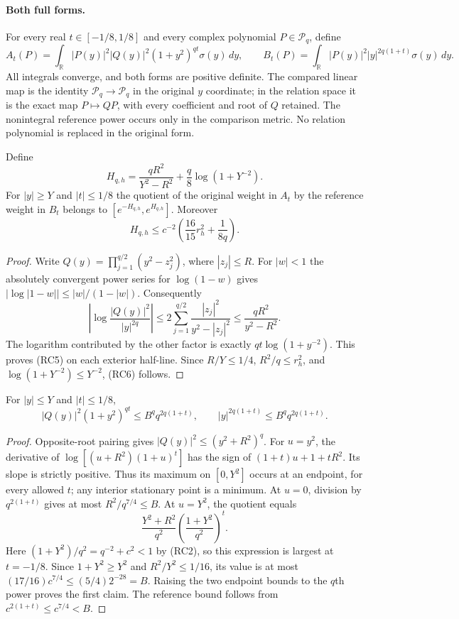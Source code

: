 \paragraph{Both full forms.}
For every real $t\in[-1/8,1/8]$ and every complex polynomial
$P\in\mathcal P_q$, define
\[
 A_t(P)=\int_{\mathbb R}|P(y)|^2|Q(y)|^2
                    (1+y^2)^{qt}\sigma(y)\,dy,\qquad
 B_t(P)=\int_{\mathbb R}|P(y)|^2|y|^{2q(1+t)}
                    \sigma(y)\,dy.               \tag{RC4}
\]
All integrals converge, and both forms are positive definite.
The compared linear map is the identity
$\mathcal P_q\longrightarrow\mathcal P_q$ in the original $y$ coordinate;
in the relation space it is the exact map
$P\mapsto QP$, with every coefficient and root of $Q$ retained.
The nonintegral reference power occurs only in the comparison metric.
No relation polynomial is replaced in the original form.

\begin{lemma}
Define
\[
 H_{q,h}=\frac{qR^2}{Y^2-R^2}
                 +\frac q8\log(1+Y^{-2}).         \tag{RC5}
\]
For $|y|\geq Y$ and $|t|\leq1/8$ the quotient of the original weight
in $A_t$ by the reference weight in $B_t$ belongs to
$[e^{-H_{q,h}},e^{H_{q,h}}]$.
Moreover
\[
 H_{q,h}\leq
 c^{-2}\left(\frac{16}{15}r_h^2+\frac1{8q}\right).
 \tag{RC6}
\]
\end{lemma}
\begin{proof}
Write $Q(y)=\prod_{j=1}^{q/2}(y^2-z_j^2)$, where
$|z_j|\leq R$. For $|w|<1$ the absolutely convergent power series for
$\log(1-w)$ gives
$|\log|1-w||\leq |w|/(1-|w|)$.
Consequently
\[
 \left|\log\frac{|Q(y)|^2}{|y|^{2q}}\right|
 \leq 2\sum_{j=1}^{q/2}
       \frac{|z_j|^2}{y^2-|z_j|^2}
 \leq\frac{qR^2}{y^2-R^2}.
\]
The logarithm contributed by the other factor is exactly
$qt\log(1+y^{-2})$.
This proves (RC5) on each exterior half-line.
Since $R/Y\leq1/4$, $R^2/q\leq r_h^2$, and
$\log(1+Y^{-2})\leq Y^{-2}$, (RC6) follows.
\end{proof}

\begin{lemma}
For $|y|\leq Y$ and $|t|\leq1/8$,
\[
 |Q(y)|^2(1+y^2)^{qt}
       \leq B^q q^{2q(1+t)},\qquad
 |y|^{2q(1+t)}
       \leq B^q q^{2q(1+t)}.                     \tag{RC7}
\]
\end{lemma}
\begin{proof}
Opposite-root pairing gives $|Q(y)|^2\leq(y^2+R^2)^q$.
For $u=y^2$, the derivative of
$\log[(u+R^2)(1+u)^t]$ has the sign of
$(1+t)u+1+tR^2$. Its slope is strictly positive.
Thus its maximum on $[0,Y^2]$ occurs at an endpoint, for every allowed
$t$; any interior stationary point is a minimum.
At $u=0$, division by $q^{2(1+t)}$ gives at most
$R^2/q^{7/4}\leq B$.
At $u=Y^2$, the quotient equals
\[
 \frac{Y^2+R^2}{q^2}
              \left(\frac{1+Y^2}{q^2}\right)^t .
\]
Here $(1+Y^2)/q^2=q^{-2}+c^2<1$ by (RC2), so this expression is largest
at $t=-1/8$. Since $1+Y^2\geq Y^2$ and $R^2/Y^2\leq1/16$, its value is
at most $(17/16)c^{7/4}\leq(5/4)2^{-28}=B$.
Raising the two endpoint bounds to the $q$th power proves the first
claim. The reference bound follows from
$c^{2(1+t)}\leq c^{7/4}<B$.
\end{proof}

